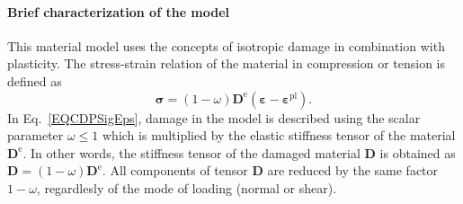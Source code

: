 \documentclass[main.tex]{subfiles}
\begin{document}
\paragraph{Brief characterization of the model}
This material model uses the concepts of isotropic damage in combination with plasticity. The stress-strain relation of the material in compression or tension is defined as
\begin{equation}
\boldsymbol{\sigma}=\left(1-\omega\right)\boldsymbol{D}^\mathrm{e}\left(\boldsymbol{\varepsilon} - \boldsymbol{\varepsilon}^\mathrm{pl} \right).
\label{EQCDPSigEps}
\end{equation}
In Eq.~\ref{EQCDPSigEps}, damage in the model is described using the scalar parameter $\omega \leq 1$ which is multiplied by the elastic stiffness tensor of the material $\boldsymbol{D}^\mathrm{e}$. In other words, the stiffness tensor of the damaged material $\boldsymbol{D}$ is obtained as $\boldsymbol{D} = \left(1-\omega\right)\boldsymbol{D}^\mathrm{e}$. All components of tensor $\boldsymbol{D}$ are reduced by the same factor $1-\omega$, regardlesly of the mode of loading (normal or shear).
\end{document}
